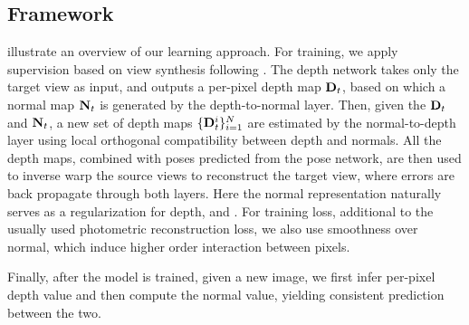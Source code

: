 \subsection{Framework}
 illustrate an overview of our learning approach. For training, we apply supervision based on view synthesis following \cite{zhou2017unsupervised}. The depth network takes only the target view as input, and
outputs a per-pixel depth map ${\mathbf D}_t$, based on which a normal map ${\mathbf N}_t$ is generated by the depth-to-normal layer. Then, given the ${\mathbf D}_t$ and ${\mathbf N}_t$, a new set of depth maps $\{{\mathbf D}_t^i\}_{i=1}^{N}$ are estimated by the normal-to-depth layer using local orthogonal compatibility between depth and normals. 
All the depth maps, combined with poses predicted from the pose network, are then used to inverse warp the source views to reconstruct the target view, where errors are back propagate through both layers. Here the normal representation naturally serves as a regularization for depth, and . For training loss, additional to the usually used photometric reconstruction loss, we also use smoothness over normal, which induce higher order interaction between pixels. 

Finally, after the model is trained, given a new image,  we first infer per-pixel depth value and then compute the normal value, yielding consistent prediction between the two.




